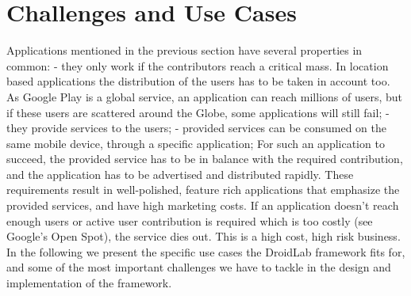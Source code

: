 \documentclass[conference,letterpaper]{IEEEtran}
\begin{document}
\section{Challenges and Use Cases}
Applications mentioned in the previous section have several properties in common:
- they only work if the contributors reach a critical mass. In location based applications the distribution of the users has to be taken in account too. As Google Play is a global service, an application can reach millions of users, but if these users are scattered around the Globe, some applications will still fail;
- they provide services to the users;
- provided services can be consumed on the same mobile device, through a specific application;
For such an application to succeed, the provided service has to be in balance with the required contribution, and the application has to be advertised and distributed rapidly. These requirements result in well-polished, feature rich applications that emphasize the provided services, and have high marketing costs. If an application doesn't reach enough users or active user contribution is required which is too costly (see Google's Open Spot), the service dies out. This is a high cost, high risk business.\\
\indent In the following we present the specific use cases the DroidLab framework fits for, and some of the most important challenges we have to tackle in the design and implementation of the framework. 
\end{document}
